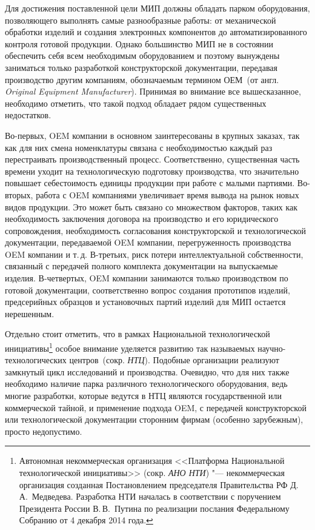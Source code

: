 Для достижения поставленной цели МИП должны обладать парком оборудования, позволяющего выполнять самые разнообразные работы: от механической обработки изделий и создания электронных компонентов до автоматизированного контроля готовой продукции. Однако большинство МИП не в состоянии обеспечить себя всем необходимым оборудованием и поэтому вынуждены заниматься только разработкой конструкторской документации, передавая производство другим компаниям, обозначаемым термином ОЕМ~(от англ. \textit{Original Equipment Manufacturer}). Принимая во внимание все вышесказанное, необходимо отметить, что такой подход обладает рядом существенных недостатков.

Во-первых, OEM компании в основном заинтересованы в крупных заказах, так как для них смена номенклатуры связана с необходимостью каждый раз перестраивать производственный процесс. Соответственно, существенная часть времени уходит на технологическую подготовку производства, что значительно повышает себестоимость единицы продукции при работе с малыми партиями. Во-вторых, работа с OEM компаниями увеличивает время вывода на рынок новых видов продукции. Это может быть связано со множеством факторов, таких как необходимость заключения договора на производство и его юридического сопровождения, необходимость согласования конструкторской и технологической документации, передаваемой OEM компании, перегруженность производства OEM компании и т.\,д. В-третьих, риск потери интеллектуальной собственности, связанный с передачей полного комплекта документации на выпускаемые изделия. В-четвертых, OEM компании занимаются только производством по готовой документации, соответственно вопрос создания прототипов изделий, предсерийных образцов и установочных партий изделий для МИП остается нерешенным.

Отдельно стоит отметить, что в рамках Национальной технологической инициативы\footnote{Автономная некоммерческая организация <<Платформа Национальной технологической инициативы>> (сокр. \textit{АНО НТИ}) "--- некоммерческая организация созданная Постановлением председателя Правительства РФ Д.\,А.~Медведева. Разработка НТИ началась в соответствии с поручением Президента России В.\,В.~Путина по реализации послания Федеральному Собранию от 4 декабря 2014 года.} особое внимание уделяется развитию так называемых научно-технологических центров~(сокр. \textit{НТЦ}). Подобные организации реализуют замкнутый цикл исследований и производства. Очевидно, что для них также необходимо наличие парка различного технологического оборудования, ведь многие разработки, которые ведутся в НТЦ являются государственной или коммерческой тайной, и применение подхода OEM, с передачей конструкторской или технологической документации сторонним фирмам (особенно зарубежным), просто недопустимо.  


